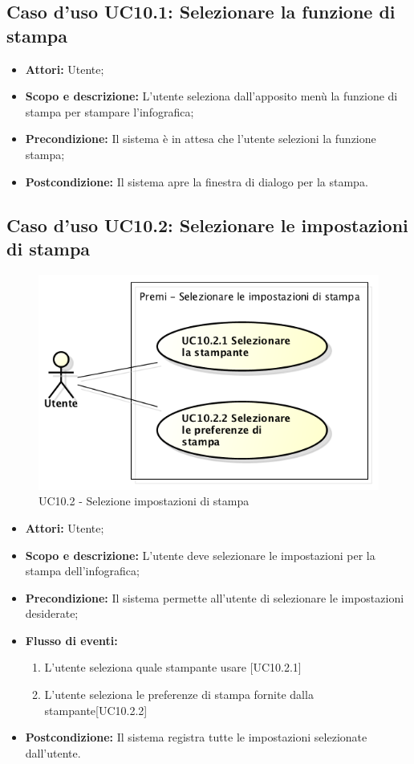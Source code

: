 \subsection{Caso d'uso UC10.1: Selezionare la funzione di stampa}
\begin{itemize}
	\item \textbf{Attori:} Utente;
	\item \textbf{Scopo e descrizione:} L'utente seleziona dall'apposito menù la funzione di stampa per stampare l'infografica;
	\item \textbf{Precondizione:} Il sistema è in attesa che l'utente selezioni la funzione stampa;
	\item \textbf{Postcondizione:} Il sistema apre la finestra di dialogo per la stampa.
\end{itemize}

\subsection{Caso d'uso UC10.2: Selezionare le impostazioni di stampa}
\begin{figure}[h] 
	\centering 
	\includegraphics[scale=0.45] {img/UC10.2.png} 
	\caption{UC10.2 - Selezione impostazioni di stampa} 
\end{figure}

\begin{itemize}
	\item \textbf{Attori:} Utente;
	\item \textbf{Scopo e descrizione:} L'utente deve selezionare le impostazioni per la stampa dell'infografica;
	\item \textbf{Precondizione:} Il sistema permette all'utente di selezionare le impostazioni desiderate;
	\item \textbf{Flusso di eventi:}
	\begin{enumerate}
		\item L'utente seleziona quale stampante usare [UC10.2.1]
		\item L'utente seleziona le preferenze di stampa fornite dalla stampante[UC10.2.2]
	\end{enumerate}
	\item \textbf{Postcondizione:} Il sistema registra tutte le impostazioni selezionate dall'utente.
\end{itemize}
	
